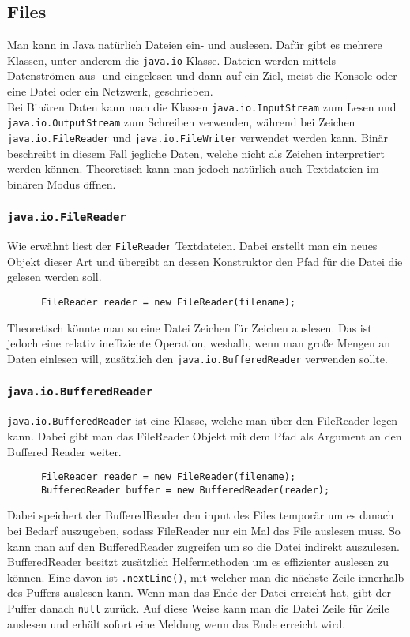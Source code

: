 \documentclass{article}
\begin{document}
	 \subsection{Files}
	 Man kann in Java natürlich Dateien ein- und auslesen. Dafür gibt es mehrere Klassen, unter anderem die \verb|java.io| Klasse. Dateien werden mittels Datenströmen aus- und eingelesen und dann auf ein Ziel, meist die Konsole oder eine Datei oder ein Netzwerk, geschrieben. \\
	 Bei Binären Daten kann man die Klassen \verb|java.io.InputStream| zum Lesen und \verb|java.io.OutputStream| zum Schreiben verwenden, während bei Zeichen \verb|java.io.FileReader| und \verb|java.io.FileWriter| verwendet werden kann. Binär beschreibt in diesem Fall jegliche Daten, welche nicht als Zeichen interpretiert werden können. Theoretisch kann man jedoch natürlich auch Textdateien im binären Modus öffnen.
	 \cprotect\subsubsection{\verb|java.io.FileReader| }
	 Wie erwähnt liest der \verb|FileReader| Textdateien. Dabei erstellt man ein neues Objekt dieser Art und übergibt an dessen Konstruktor den Pfad für die Datei die gelesen werden soll.
	 \begin{verbatim}
	  FileReader reader = new FileReader(filename);
	 \end{verbatim} 
	 Theoretisch könnte man so eine Datei Zeichen für Zeichen auslesen. Das ist jedoch eine relativ ineffiziente Operation, weshalb, wenn man große Mengen an Daten einlesen will, zusätzlich den \verb|java.io.BufferedReader| verwenden sollte. 
	 \cprotect\subsubsection{\verb|java.io.BufferedReader|}
	 \verb|java.io.BufferedReader| ist eine Klasse, welche man über den FileReader legen kann. Dabei gibt man das FileReader Objekt mit dem Pfad als Argument an den Buffered Reader weiter.
	 \begin{verbatim}
	  FileReader reader = new FileReader(filename);
	  BufferedReader buffer = new BufferedReader(reader);
	  \end{verbatim} 
	  Dabei speichert der BufferedReader den input des Files temporär um es danach bei Bedarf auszugeben, sodass FileReader nur ein Mal das File auslesen muss. So kann man auf den BufferedReader zugreifen um so die Datei indirekt auszulesen. BufferedReader besitzt zusätzlich Helfermethoden um es effizienter auslesen zu können. Eine davon ist \verb|.nextLine()|, mit welcher man die nächste Zeile innerhalb des Puffers auslesen kann. Wenn man das Ende der Datei erreicht hat, gibt der Puffer danach \verb|null| zurück. Auf diese Weise kann man die Datei Zeile für Zeile auslesen und erhält sofort eine Meldung wenn das Ende erreicht wird.
\end{document}
